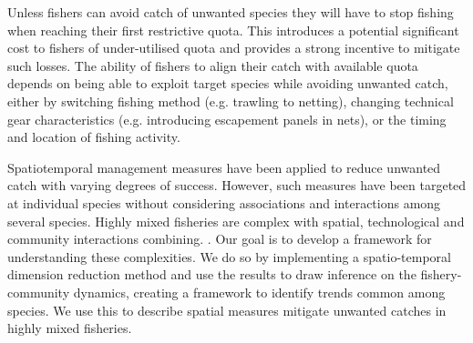 \documentclass{nature}
\begin{document}
\begin{linenumbers}
    Unless
fishers can avoid catch of unwanted species they will have to stop fishing when
reaching their first restrictive quota. This introduces a potential significant
cost to fishers of under-utilised quota\cite{Ulrich2016} and provides a strong
incentive to mitigate such losses\cite{Condie2013}. The ability of fishers to
align their catch with available quota depends on being able to exploit target
species while avoiding unwanted catch, either by switching fishing
method (e.g.  trawling to netting), changing technical gear characteristics
(e.g.  introducing escapement panels in nets), or the timing and location of
fishing activity\cite{vanPutten2012a}. 

Spatiotemporal management measures  have been applied to reduce unwanted catch with varying
degrees of success\cite{Needle2011, Dunn2014a}.  However, such measures
have  been targeted at individual species without
considering associations and interactions among several species. Highly mixed
fisheries are complex with spatial, technological and community interactions
combining.  .  Our goal is to
develop a framework for understanding these complexities. We do so by
implementing a spatio-temporal dimension reduction method and use the results
to draw inference on the fishery-community dynamics, creating a framework to
identify trends common among species. We use this to describe
 spatial
measures  mitigate
unwanted catches in highly mixed fisheries.



\end{linenumbers}
\end{document}
